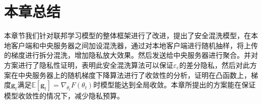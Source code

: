 \section{本章总结}
本章节我们针对联邦学习模型的整体框架进行了改进，提出了安全混洗模型，在本地客户端和中央服务器之间加设混洗器，通过对本地客户端进行随机抽样，将上传的梯度进行拆分混洗，增加隐私放大效果。然后发送给中央服务器进行聚合。并对方案进行了隐私性证明，表明此安全混洗算法可以保证$\varepsilon_{\mathrm{c}}$的差分隐私，然后对此方案在中央服务器上的随机梯度下降算法进行了收敛性的分析，证明在凸函数上，梯度$\mathbf{g}_{t}$满足$\mathbb{E}\left[\mathbf{g}_{t}\right]=\nabla_{\theta_{t}} F\left(\theta_{t}\right)$时模型能达到全局收敛。本章所提出的方案能在保证模型收敛性的情况下，减少隐私预算。


